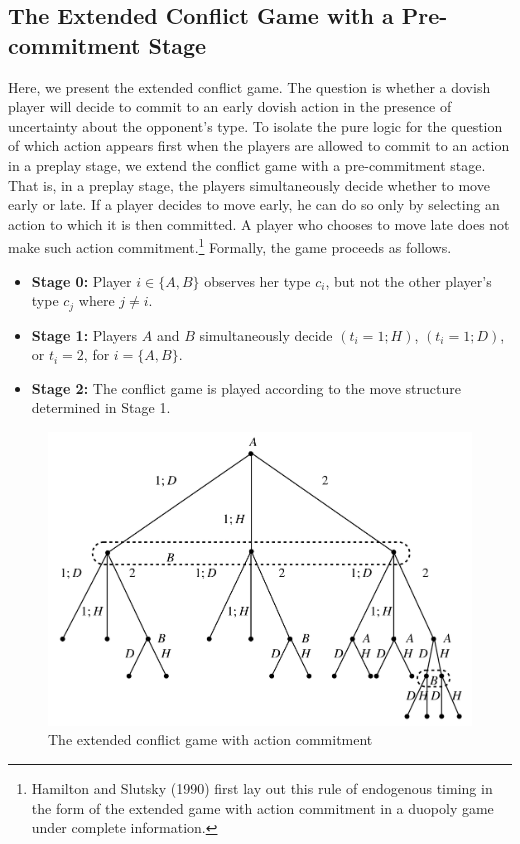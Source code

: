 \documentclass[12pt,english]{article}
\begin{document}
\subsection{The Extended Conflict Game with a Pre-commitment Stage}
Here, we present the extended conflict game. The question is whether a dovish player will decide to commit to an early dovish action in the presence of uncertainty about the opponent's type. To isolate the pure logic for the question of which action appears first when the players are allowed to commit to an action in a preplay stage, we extend the conflict game with a pre-commitment stage. That is, in a preplay stage, the players simultaneously decide whether to move early or late. If a player decides to move early, he can do so only by selecting an action to which it is then committed. A player who chooses to move late does not make such action commitment.\footnote{Hamilton and Slutsky (1990) first lay out this rule of endogenous timing in the form of the extended game with action commitment in a duopoly game under complete information.} Formally, the game proceeds as follows.\par
\begin{itemize}\itemsep-2pt 
\item \textbf{Stage 0:} Player $i \in \{A,B\}$ observes her type $c_i$, but not the other player's type $c_j$ where $j\neq i$.
\item \textbf{Stage 1:} Players $A$ and $B$ simultaneously decide $(t_{i}=1; H)$, $(t_{i}=1; D)$, or $t_i=2$, for $i=\{A,B\}$. 
\item \textbf{Stage 2:} The conflict game is played according to the move structure determined in Stage 1.
\end{itemize}\par
\begin{figure}[t]
\centering
	\includegraphics[scale=0.18]{fig3.jpg}
	\caption{The extended conflict game with action commitment}
\end{figure}\par
\end{document}
